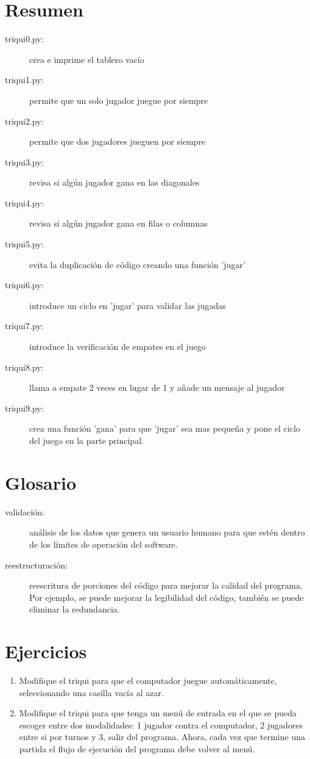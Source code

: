 \section{Resumen}
\begin{description}
\item [{triqui0.py:}] crea e imprime el tablero vacío 
\item [{triqui1.py:}] permite que un solo jugador juegue por siempre 
\item [{triqui2.py:}] permite que dos jugadores jueguen por siempre 
\item [{triqui3.py:}] revisa si algún jugador gana en las diagonales 
\item [{triqui4.py:}] revisa si algún jugador gana en filas o columnas 
\item [{triqui5.py:}] evita la duplicación de código creando una función
'jugar' 
\item [{triqui6.py:}] introduce un ciclo en 'jugar' para validar las jugadas 
\item [{triqui7.py:}] introduce la verificación de empates en el juego 
\item [{triqui8.py:}] llama a empate 2 veces en lugar de 1 y añade un mensaje
al jugador 
\item [{triqui9.py:}] crea una función 'gana' para que 'jugar' sea mas
pequeña y pone el ciclo del juego en la parte principal. 
\end{description}

\section{Glosario}
\begin{description}
\item [{validación:}] análisis de los datos que genera un usuario humano
para que estén dentro de los límites de operación del software.
\item [{reestructuración:}] reescritura de porciones del código para mejorar
la calidad del programa. Por ejemplo, se puede mejorar la legibilidad
del código, también se puede eliminar la redundancia.

 
\end{description}

\section{Ejercicios}
\begin{enumerate}
\item Modifique el triqui para que el computador juegue automáticamente,
seleccionando una casilla vacía al azar.
\item Modifique el triqui para que tenga un menú de entrada en el que se
pueda escoger entre dos modalidades: 1 jugador contra el computador,
2 jugadores entre si por turnos y 3, salir del programa. Ahora, cada
vez que termine una partida el flujo de ejecución del programa debe
volver al menú.
\end{enumerate}

